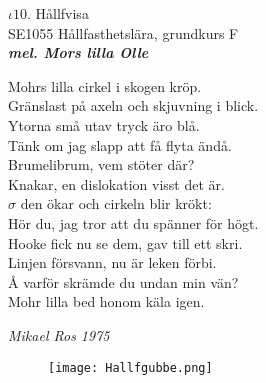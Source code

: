 \documentclass[a6paper,10pt]{article}
\newcommand{\mel}[1]{\small\textbf{\textit{mel. #1 \\}}}
\begin{document}
\setlength{\oddsidemargin}{-0.37in}
\noindent
\begin{center}
\Large $\iota10$. Hållfvisa \\ 
\footnotesize SE1055 Hållfasthetslära, grundkurs F\\
\mel{Mors lilla Olle}
\end{center}
Mohrs lilla cirkel i skogen kröp. \\
Gränslast på axeln och skjuvning i blick. \\
Ytorna små utav tryck äro blå. \\
Tänk om jag slapp att få flyta ändå. 
\vspace{5pt} \\
Brumelibrum, vem stöter där? \\
Knakar, en dislokation visst det är. \\
$\sigma$ den ökar och cirkeln blir krökt: \\
Hör du, jag tror att du spänner för högt. 
\vspace{5pt} \\
Hooke fick nu se dem, gav till ett skri. \\
Linjen försvann, nu är leken förbi. \\
Å varför skrämde du undan min vän? \\
Mohr lilla bed honom käla igen. 
\begin{flushright}
\textit{Mikael Ros 1975}
\end{flushright}

\begin{figure}[!h]
\centering
\texttt{[image: Hallfgubbe.png]}
\end{figure}
\end{document}
